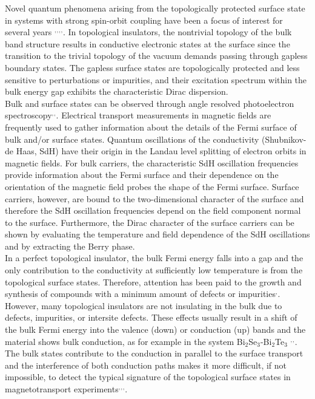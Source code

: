 \documentclass[aps,prb,twocolumn,showpacs,groupedaddress]{revtex4-1}
\begin{document}
\indent Novel quantum phenomena arising from the topologically protected surface state in systems with strong spin-orbit coupling have been a focus of interest for several years \cite{Hasan:01}$^{,}$\cite{Qi:02}$^{,}$\cite{Ando:03}$^{,}$\cite{Ando1:04}$^{,}$\cite{Cava:05}. In topological insulators, the nontrivial topology of the bulk band structure results in conductive electronic states at the surface since the transition to the trivial topology of the vacuum demands  passing through gapless boundary states. The gapless surface states are topologically protected and less sensitive to perturbations or impurities, and their excitation spectrum within the bulk energy gap exhibits the characteristic Dirac dispersion.\\
\indent Bulk and surface states can be observed through angle resolved photoelectron spectroscopy\cite{Hasan:01}$^{,}$\cite{Qi:02}$^{,}$\cite{Ando:03}. Electrical transport measurements in magnetic fields are frequently used to gather information about the details of the Fermi surface of bulk and/or surface states. Quantum oscillations of the conductivity (Shubnikov-de Haas, SdH) have their origin in the Landau level splitting of electron orbits in magnetic fields. For bulk carriers, the characteristic SdH oscillation frequencies provide information about the Fermi surface and their dependence on the orientation of the magnetic field probes the shape of the Fermi surface. Surface carriers, however, are bound to the two-dimensional character of the surface and therefore the SdH oscillation frequencies depend on the field component normal to the surface. Furthermore, the Dirac character of the surface carriers can be shown by evaluating the temperature and field dependence of the SdH oscillations and by extracting the Berry phase.\\
\indent In a perfect topological insulator, the bulk Fermi energy falls into a gap and the only contribution to the conductivity at sufficiently low temperature is from the topological surface states. Therefore, attention has been paid to the growth and synthesis of compounds with a minimum amount of defects or impurities\cite{Taskin:06}$^{,}$\cite{Gaku:07}. However, many topological insulators are not insulating in the bulk due to defects, impurities, or intersite defects. These effects usually result in a shift of the bulk Fermi energy into the valence (down) or conduction (up) bands and the material shows bulk conduction, as for example in the system Bi$_2$Se$_3$-Bi$_2$Te$_3$ \cite{Xia:08}$^,$\cite{Chen:09}$^,$\cite{Hsieh:10}. The bulk states contribute to the conduction in parallel to the surface transport and the interference of both conduction paths makes it more difficult, if not impossible, to detect the typical signature of the topological surface states in magnetotransport experiments\cite{Qu:11}$^,$\cite{Analytis:12}$^,$\cite{Eto:13}$^,$\cite{Cao:14}.\\
\end{document}
